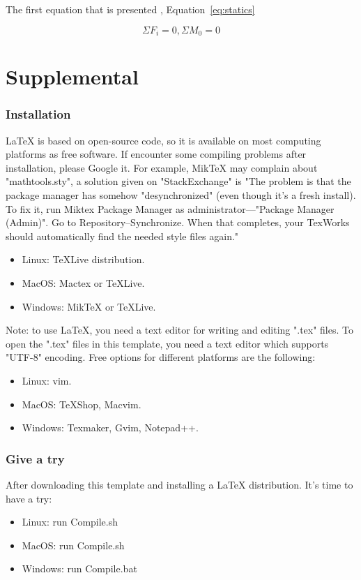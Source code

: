 The first equation that is presented , Equation~\ref{eq:statics}

\begin{equation}\label{eq:statics}
	\Sigma F_i=0	,	\Sigma	 M_0=0 
\end{equation} 


\chapter{Supplemental}
\subsection{Installation} %
LaTeX is based on open-source code, so it is available on most computing platforms as free software. If encounter some compiling problems after installation, please Google it. For example, MikTeX may complain about "mathtools.sty", a solution given on "StackExchange" is "The problem is that the package manager has somehow "desynchronized" (even though it's a fresh install). To fix it, run Miktex Package Manager as administrator---"Package Manager (Admin)". Go to Repository--Synchronize. When that completes, your TexWorks should automatically find the needed style files again."
\begin{itemize}
    \item Linux: TeXLive distribution. 
    \item MacOS: Mactex or TeXLive.
    \item Windows: MikTeX or TeXLive. 
\end{itemize}

Note: to use \LaTeX{}, you need a text editor for writing and editing ".tex" files. To open the ".tex" files in this template, you need a text editor which supports "UTF-8" encoding. Free options for different platforms are the following:
\begin{itemize}
    \item Linux: vim. 
    \item MacOS: TeXShop, Macvim.
    \item Windows: Texmaker, Gvim, Notepad++. 
\end{itemize}

\subsection{Give a try} %
After downloading this template and installing a \LaTeX{} distribution. It's time to have a try:
\begin{itemize}
    \item Linux: run Compile.sh
    \item MacOS: run Compile.sh
    \item Windows: run Compile.bat
\end{itemize}

